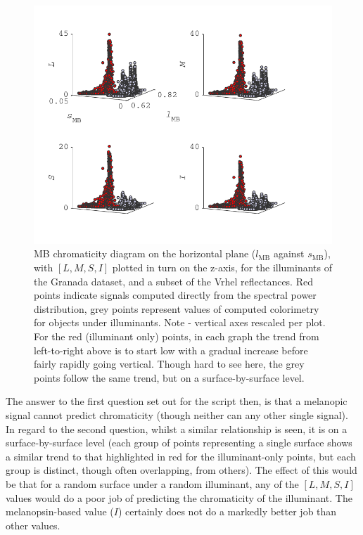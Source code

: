 \begin{figure}[htbp]
    \includegraphics[max width=\textwidth]{figs/comp/melcomp_1/level1sigspredictingColorimetry.pdf}
    \caption{\gls{MB} chromaticity diagram on the horizontal plane ($l_{\text{MB}}$ against $s_{\text{MB}}$), with $[L,M,S,I]$ plotted in turn on the z-axis, for the illuminants of the Granada dataset, and a subset of the Vrhel reflectances. Red points indicate signals computed directly from the spectral power distribution, grey points represent values of computed colorimetry for objects under illuminants. Note - vertical axes rescaled per plot. For the red (illuminant only) points, in each graph the trend from left-to-right above is to start low with a gradual increase before fairly rapidly going vertical. Though hard to see here, the grey points follow the same trend, but on a surface-by-surface level.}
    \label{fig:level1}
\end{figure} 

The answer to the first question set out for the script then, is that a melanopic signal cannot predict chromaticity (though neither can any other single signal). In regard to the second question, whilst a similar relationship is seen, it is on a surface-by-surface level (each group of points representing a single surface shows a similar trend to that highlighted in red for the illuminant-only points, but each group is distinct, though often overlapping, from others). The effect of this would be that for a random surface under a random illuminant, any of the $[L,M,S,I]$ values would do a poor job of predicting the chromaticity of the illuminant. The melanopsin-based value ($I$) certainly does not do a markedly better job than other values.

